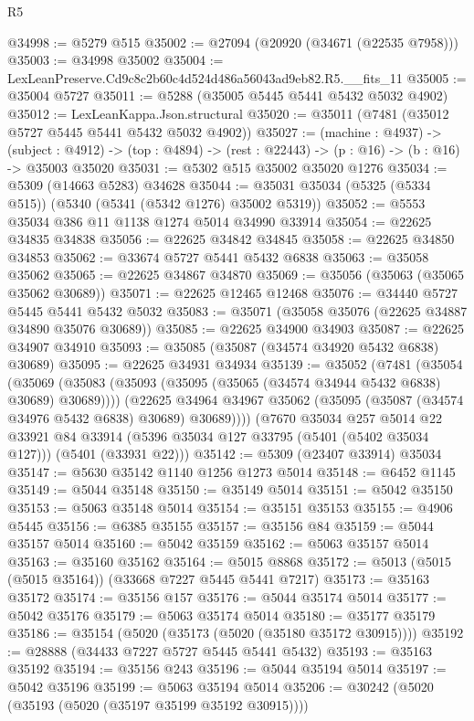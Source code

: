 \begin{lexlean}{R5}
\begin{coremodule}
@34998 := @5279 @515
@35002 := @27094 (@20920 (@34671 (@22535 @7958)))
@35003 := @34998 @35002
@35004 := LexLeanPreserve.Cd9c8c2b60c4d524d486a56043ad9eb82.R5.__fits_11
@35005 := @35004 @5727
@35011 := @5288 (@35005 @5445 @5441 @5432 @5032 @4902)
@35012 := LexLeanKappa.Json.structural
@35020 := @35011 (@7481 (@35012 @5727 @5445 @5441 @5432 @5032 @4902))
@35027 := (machine : @4937) ->
  (subject : @4912) -> (top : @4894) -> (rest : @22443) -> (p : @16) -> (b : @16) -> @35003 @35020
@35031 := @5302 @515 @35002 @35020 @1276
@35034 := @5309 (@14663 @5283) @34628
@35044 := @35031 @35034 (@5325 (@5334 @515)) (@5340 (@5341 (@5342 @1276) @35002 @5319))
@35052 := @5553 @35034 @386 @11 @1138 @1274 @5014 @34990 @33914
@35054 := @22625 @34835 @34838
@35056 := @22625 @34842 @34845
@35058 := @22625 @34850 @34853
@35062 := @33674 @5727 @5441 @5432 @6838
@35063 := @35058 @35062
@35065 := @22625 @34867 @34870
@35069 := @35056 (@35063 (@35065 @35062 @30689))
@35071 := @22625 @12465 @12468
@35076 := @34440 @5727 @5445 @5441 @5432 @5032
@35083 := @35071 (@35058 @35076 (@22625 @34887 @34890 @35076 @30689))
@35085 := @22625 @34900 @34903
@35087 := @22625 @34907 @34910
@35093 := @35085 (@35087 (@34574 @34920 @5432 @6838) @30689)
@35095 := @22625 @34931 @34934
@35139 := @35052
    (@7481
      (@35054
        (@35069 (@35083 (@35093 (@35095 (@35065 (@34574 @34944 @5432 @6838) @30689) @30689))))
        (@22625 @34964 @34967 @35062 (@35095 (@35087 (@34574 @34976 @5432 @6838) @30689) @30689))))
    (@7670
      @35034
      @257
      @5014
      @22
      @33921
      @84
      @33914
      (@5396 @35034 @127 @33795 (@5401 (@5402 @35034 @127)))
      (@5401 (@33931 @22)))
@35142 := @5309 (@23407 @33914) @35034
@35147 := @5630 @35142 @1140 @1256 @1273 @5014
@35148 := @6452 @1145
@35149 := @5044 @35148
@35150 := @35149 @5014
@35151 := @5042 @35150
@35153 := @5063 @35148 @5014
@35154 := @35151 @35153
@35155 := @4906 @5445
@35156 := @6385 @35155
@35157 := @35156 @84
@35159 := @5044 @35157 @5014
@35160 := @5042 @35159
@35162 := @5063 @35157 @5014
@35163 := @35160 @35162
@35164 := @5015 @8868
@35172 := @5013 (@5015 (@5015 @35164)) (@33668 @7227 @5445 @5441 @7217)
@35173 := @35163 @35172
@35174 := @35156 @157
@35176 := @5044 @35174 @5014
@35177 := @5042 @35176
@35179 := @5063 @35174 @5014
@35180 := @35177 @35179
@35186 := @35154 (@5020 (@35173 (@5020 (@35180 @35172 @30915))))
@35192 := @28888 (@34433 @7227 @5727 @5445 @5441 @5432)
@35193 := @35163 @35192
@35194 := @35156 @243
@35196 := @5044 @35194 @5014
@35197 := @5042 @35196
@35199 := @5063 @35194 @5014
@35206 := @30242 (@5020 (@35193 (@5020 (@35197 @35199 @35192 @30915))))

\end{coremodule}
\end{lexlean}
